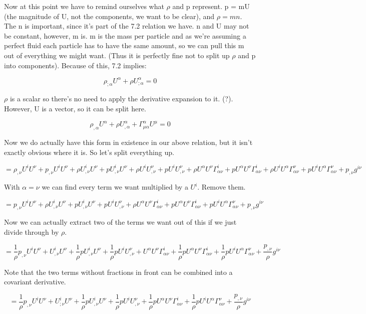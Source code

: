 \documentclass[landscape,letterpaper,10pt,english]{article}
\begin{document}
    Now at this point we have to remind ourselves what \(\rho\) and p
represent. p = mU (the magnitude of U, not the components, we want to be
clear), and \(\rho = mn\). The n is important, since it's part of the
7.2 relation we have. n and U may not be constant, however, m is. m is
the mass per particle and as we're assuming a perfect fluid each
particle has to have the same amount, so we can pull this m out of
everything we might want. (Thus it is perfectly fine not to split up
\(\rho\) and p into components). Because of this, 7.2 implies:

\[ \rho_{;\alpha}U^\alpha + \rho U^\alpha_{;\alpha} =0 \]

\(\rho\) is a scalar so there's no need to apply the derivative
expansion to it. (?). However, U is a vector, so it can be split here.

\[ \rho_{,\alpha}U^\alpha + \rho U^\alpha_{,\alpha} + \Gamma^\alpha_{\mu\alpha}U^\mu =0 \]

    Now we do actually have this form in existence in our above relation,
but it isn't exactly obvious where it is. So let's split everything up.

\[ = \rho_{,\nu}U^i U^\nu + p_{,\nu}U^i U^\nu + \rho U^i_{,\nu} U^\nu + pU^i_{,\nu} U^\nu  + \rho U^i U^\nu_{,\nu} + pU^i U^\nu_{,\nu}  + \rho U^\alpha U^\nu \Gamma^i_{\alpha\nu} + pU^\alpha U^\nu \Gamma^i_{\alpha\nu} + \rho U^i U^\alpha \Gamma^\nu_{\alpha\nu} + pU^i U^\alpha \Gamma^\nu_{\alpha\nu} + p_{,\nu}g^{i\nu}\]

    With \(\alpha = \nu\) we can find every term we want multiplied by a
\(U^i\). Remove them.

\[ = p_{,\nu}U^i U^\nu + \rho U^i_{,\nu} U^\nu + pU^i_{,\nu} U^\nu + pU^i U^\nu_{,\nu}  + \rho U^\alpha U^\nu \Gamma^i_{\alpha\nu} + pU^\alpha U^\nu \Gamma^i_{\alpha\nu} + pU^i U^\alpha \Gamma^\nu_{\alpha\nu} + p_{,\nu}g^{i\nu}\]

    Now we can actually extract two of the terms we want out of this if we
just divide through by \(\rho\).

\[ = \frac1\rho p_{,\nu}U^i U^\nu + U^i_{,\nu} U^\nu + \frac1\rho pU^i_{,\nu} U^\nu + \frac1\rho pU^i U^\nu_{,\nu}  + U^\alpha U^\nu \Gamma^i_{\alpha\nu} + \frac1\rho pU^\alpha U^\nu \Gamma^i_{\alpha\nu} + \frac1\rho pU^i U^\alpha \Gamma^\nu_{\alpha\nu} + \frac{p_{,\nu}}{\rho}g^{i\nu}\]

Note that the two terms without fractions in front can be combined into
a covariant derivative.

\[ = \frac1\rho p_{,\nu}U^i U^\nu + U^i_{;\nu} U^\nu + \frac1\rho pU^i_{,\nu} U^\nu + \frac1\rho pU^i U^\nu_{,\nu}  + \frac1\rho pU^\alpha U^\nu \Gamma^i_{\alpha\nu} + \frac1\rho pU^i U^\alpha \Gamma^\nu_{\alpha\nu} + \frac{p_{,\nu}}{\rho}g^{i\nu}\]
\end{document}
